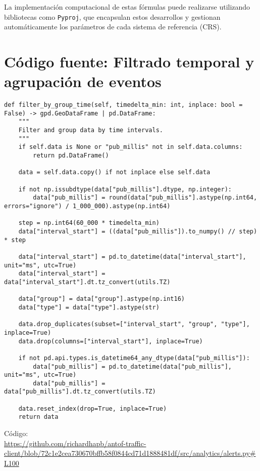 \documentclass[12pt]{article}
\begin{document}
La implementación computacional de estas fórmulas puede realizarse utilizando bibliotecas como \texttt{Pyproj}, que encapsulan estos desarrollos y gestionan automáticamente los parámetros de cada sistema de referencia (CRS).

\section{Código fuente: Filtrado temporal y agrupación de eventos}
\label{annex:filter_code}

\begin{verbatim}
def filter_by_group_time(self, timedelta_min: int, inplace: bool = False) -> gpd.GeoDataFrame | pd.DataFrame:
    """
    Filter and group data by time intervals.
    """
    if self.data is None or "pub_millis" not in self.data.columns:
        return pd.DataFrame()

    data = self.data.copy() if not inplace else self.data

    if not np.issubdtype(data["pub_millis"].dtype, np.integer):
        data["pub_millis"] = round(data["pub_millis"].astype(np.int64, errors="ignore") / 1_000_000).astype(np.int64)

    step = np.int64(60_000 * timedelta_min)
    data["interval_start"] = ((data["pub_millis"]).to_numpy() // step) * step

    data["interval_start"] = pd.to_datetime(data["interval_start"], unit="ms", utc=True)
    data["interval_start"] = data["interval_start"].dt.tz_convert(utils.TZ)

    data["group"] = data["group"].astype(np.int16)
    data["type"] = data["type"].astype(str)

    data.drop_duplicates(subset=["interval_start", "group", "type"], inplace=True)
    data.drop(columns=["interval_start"], inplace=True)

    if not pd.api.types.is_datetime64_any_dtype(data["pub_millis"]):
        data["pub_millis"] = pd.to_datetime(data["pub_millis"], unit="ms", utc=True)
        data["pub_millis"] = data["pub_millis"].dt.tz_convert(utils.TZ)

    data.reset_index(drop=True, inplace=True)
    return data
\end{verbatim}

Código: \\
\url{https://github.com/richardhapb/antof-traffic-client/blob/72c1e2cea730670bffb58f0844cd71d1888481df/src/analytics/alerts.py#L100}
\end{document}
